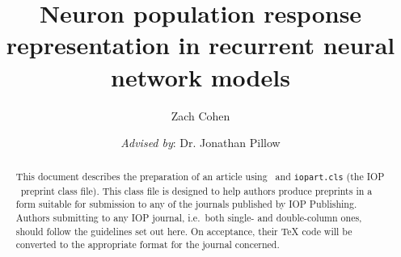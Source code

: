 \documentclass[12pt,a4paper,final]{iopart}
\begin{document}
\title[Neural response representation - IW Report]{Neuron population response representation in recurrent neural network models}

\author{Zach Cohen}
\address{Department of Computer Science}
\address{Princeton University}
\address{Princeton, NJ 08544}

\author{\emph{Advised by}: Dr. Jonathan Pillow}
\address{Princeton Neuroscience Institute}
\address{Princeton University}
\address{Princeton, NJ 08544}

\begin{abstract}
This document describes the  preparation of an article using \LaTeXe\ and 
\verb"iopart.cls" (the IOP \LaTeXe\ preprint class file).
This class file is designed to help 
authors produce preprints in a form suitable for submission to any of the
journals published by IOP Publishing.
Authors submitting to any IOP journal, i.e.\ 
both single- and double-column ones, should follow the guidelines set out here. 
On acceptance, their TeX code will be converted to 
the appropriate format for the journal concerned.

\end{abstract}

\end{document}
